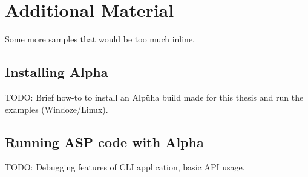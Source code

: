 \chapter{Additional Material}

Some more samples that would be too much inline. 

\section{Installing Alpha}

TODO: Brief how-to to install an Alpüha build made for this thesis and run the examples (Windoze/Linux).

\section{Running ASP code with Alpha}

TODO: Debugging features of CLI application, basic API usage.

